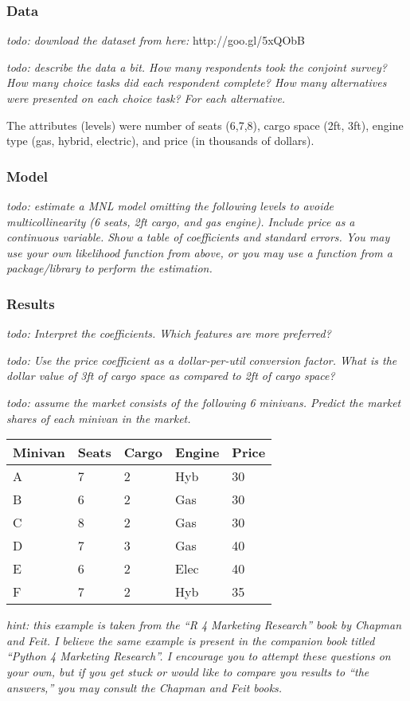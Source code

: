 \documentclass[
  letterpaper,
  DIV=11,
  numbers=noendperiod]{scrartcl}
\begin{document}
\subsubsection{Data}\label{data}

\emph{todo: download the dataset from here:} http://goo.gl/5xQObB

\emph{todo: describe the data a bit. How many respondents took the
conjoint survey? How many choice tasks did each respondent complete? How
many alternatives were presented on each choice task? For each
alternative.}

The attributes (levels) were number of seats (6,7,8), cargo space (2ft,
3ft), engine type (gas, hybrid, electric), and price (in thousands of
dollars).

\subsubsection{Model}\label{model}

\emph{todo: estimate a MNL model omitting the following levels to avoide
multicollinearity (6 seats, 2ft cargo, and gas engine). Include price as
a continuous variable. Show a table of coefficients and standard errors.
You may use your own likelihood function from above, or you may use a
function from a package/library to perform the estimation.}

\subsubsection{Results}\label{results}

\emph{todo: Interpret the coefficients. Which features are more
preferred?}

\emph{todo: Use the price coefficient as a dollar-per-util conversion
factor. What is the dollar value of 3ft of cargo space as compared to
2ft of cargo space?}

\emph{todo: assume the market consists of the following 6 minivans.
Predict the market shares of each minivan in the market.}

\begin{longtable}[]{@{}lllll@{}}
\toprule\noalign{}
Minivan & Seats & Cargo & Engine & Price \\
\midrule\noalign{}
\endhead
\bottomrule\noalign{}
\endlastfoot
A & 7 & 2 & Hyb & 30 \\
B & 6 & 2 & Gas & 30 \\
C & 8 & 2 & Gas & 30 \\
D & 7 & 3 & Gas & 40 \\
E & 6 & 2 & Elec & 40 \\
F & 7 & 2 & Hyb & 35 \\
\end{longtable}

\emph{hint: this example is taken from the ``R 4 Marketing Research''
book by Chapman and Feit. I believe the same example is present in the
companion book titled ``Python 4 Marketing Research''. I encourage you
to attempt these questions on your own, but if you get stuck or would
like to compare you results to ``the answers,'' you may consult the
Chapman and Feit books.}
\end{document}
